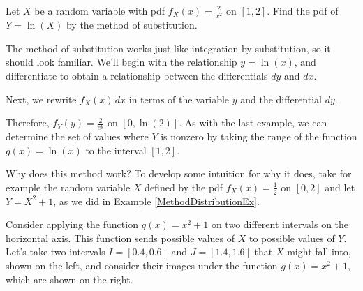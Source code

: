 \begin{examp}Let $X$ be a random variable with pdf $f_X(x) = \frac{2}{x^2}$ on $[1,2]$. Find the pdf of $Y = \ln(X)$ by the method of substitution.
\par
\noindent The method of substitution works just like integration by substitution, so it should look familiar. We'll begin with the relationship $y = \ln(x)$, and differentiate to obtain a relationship between the differentials $dy$ and $dx$.
\par
\noindent Next, we rewrite $f_X(x) \, dx$ in terms of the variable $y$ and the differential $dy$.
\par
\noindent Therefore, $f_Y(y) = \frac{2}{e^y}$ on $[0,\ln(2)]$. As with the last example, we can determine the set of values where $Y$ is nonzero by taking the range of the function $g(x) = \ln(x)$ to the interval $[1,2]$.
\end{examp}
\par
Why does this method work? To develop some intuition for why it does, take for example the random variable $X$ defined by the pdf $f_X(x) = \frac{1}{2}$ on $[0,2]$ and let $Y =X^2+1$, as we did in Example \ref{MethodDistributionEx}.
\par
Consider applying the function $g(x) = x^2+1$ on two different intervals on the horizontal axis. This function sends possible values of $X$ to possible values of $Y$. Let's take two intervals $I = [0.4, 0.6]$ and $J = [1.4,1.6]$ that $X$ might fall into, shown on the left, and consider their images under the function $g(x) = x^2+1$, which are shown on the right.

